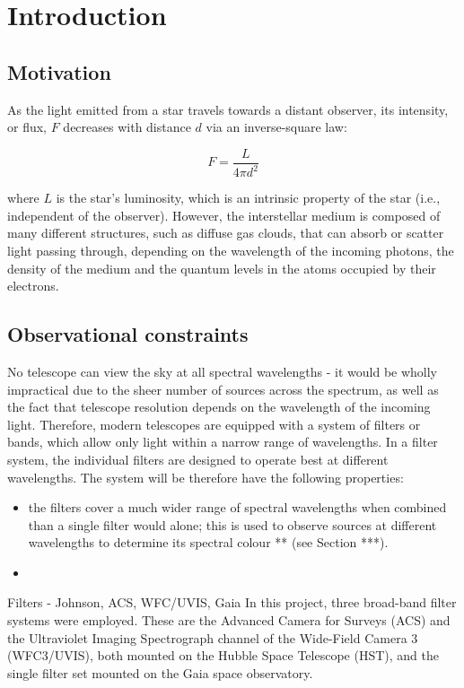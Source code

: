 \documentclass[12pt, a4paper]{report}
\begin{document}
\chapter{Introduction}
\section{Motivation}
As the light emitted from a star travels towards a distant observer, its intensity, or flux, $F$ decreases with distance $d$ via an inverse-square law:

\begin{equation}
\label{flux_def}
F = \frac{L}{4 \pi d^{2}}
\end{equation}

where $L$ is the star's luminosity, which is an intrinsic property of the star (i.e., independent of the observer).
However, the interstellar medium is composed of many different structures, such as diffuse gas clouds, that can absorb or scatter light passing through, depending on the wavelength of the incoming photons, the density of the medium and the quantum levels in the atoms occupied by their electrons.

\section{Observational constraints}
No telescope can view the sky at all spectral wavelengths - it would be wholly impractical due to the sheer number of sources across the spectrum, as well as the fact that telescope resolution depends on the wavelength of the incoming light. Therefore, modern telescopes are equipped with a system of filters or bands, which allow only light within a narrow range of wavelengths. In a filter system, the individual filters are designed to operate best at different wavelengths. The system will be therefore have the following properties:

\begin{itemize}
\item the filters cover a much wider range of spectral wavelengths when combined than a single filter would alone; this is used to observe sources at different wavelengths to determine its spectral colour ** (see Section ***).
\item 
\end{itemize}

Filters - Johnson, ACS, WFC/UVIS, Gaia
In this project, three broad-band filter systems were employed. These are the Advanced Camera for Surveys (ACS) and the Ultraviolet Imaging Spectrograph channel of the Wide-Field Camera 3 (WFC3/UVIS), both mounted on the Hubble Space Telescope (HST), and the single filter set mounted on the Gaia space observatory.
\end{document}
